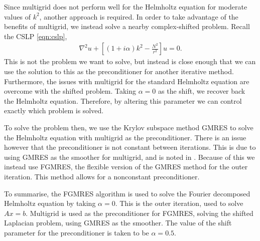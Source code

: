 Since multigrid does not perform well for the Helmholtz equation for moderate values of $k^2$, another approach is required.
In order to take advantage of the benefits of multigrid, we instead solve a nearby complex-shifted problem.
Recall the CSLP \eqref{eqn:cslp},
\begin{align}
	\nabla^2 u + \left[(1+i\alpha)k^2 - \frac{N^2}{r^2}\right] u = 0.
\end{align}
This is not the problem we want to solve, but instead is close enough that we can use the solution to this as the preconditioner for another iterative method.
Furthermore, the issues with multigrid for the standard Helmholtz equation are overcome with the shifted problem.
Taking $\alpha=0$ as the shift, we recover back the Helmholtz equation.
Therefore, by altering this parameter we can control exactly which problem is solved.

To solve the problem then, we use the Krylov subspace method GMRES to solve the Helmholtz equation with multigrid as the preconditioner.
There is an issue however that the preconditioner is not constant between iterations.
This is due to using GMRES as the smoother for multigrid, and is noted in \cite{elman}.
Because of this we instead use FGMRES, the flexible version of the GMRES method for the outer iteration.
This method allows for a nonconstant preconditioner.

To summarise, the FGMRES algorithm is used to solve the Fourier decomposed Helmholtz equation by taking $\alpha=0$.
This is the outer iteration, used to solve $Ax=b$.
Multigrid is used as the preconditioner for FGMRES, solving the shifted Laplacian problem, using GMRES as the smoother.
The value of the shift parameter for the preconditioner is taken to be $\alpha=0.5$.